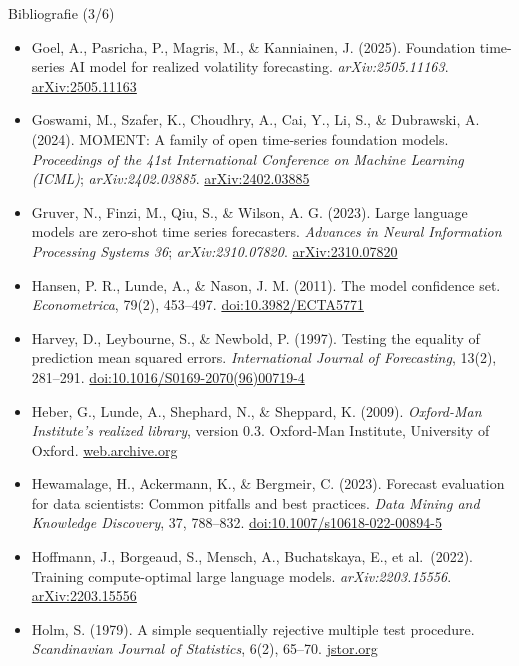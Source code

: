 \begin{frame}{Bibliografie (3/6)}
\itemsize{\tiny}
\begin{itemize}
    \item Goel, A., Pasricha, P., Magris, M., \& Kanniainen, J. (2025). Foundation time-series AI model for realized volatility forecasting. \textit{arXiv:2505.11163}. \href{https://arxiv.org/abs/2505.11163}{arXiv:2505.11163}
    \item Goswami, M., Szafer, K., Choudhry, A., Cai, Y., Li, S., \& Dubrawski, A. (2024). MOMENT: A family of open time-series foundation models. \textit{Proceedings of the 41st International Conference on Machine Learning (ICML)}; \textit{arXiv:2402.03885}. \href{https://arxiv.org/abs/2402.03885}{arXiv:2402.03885}
    \item Gruver, N., Finzi, M., Qiu, S., \& Wilson, A. G. (2023). Large language models are zero-shot time series forecasters. \textit{Advances in Neural Information Processing Systems 36}; \textit{arXiv:2310.07820}. \href{https://arxiv.org/abs/2310.07820}{arXiv:2310.07820}
    \item Hansen, P. R., Lunde, A., \& Nason, J. M. (2011). The model confidence set. \textit{Econometrica}, 79(2), 453--497. \href{https://doi.org/10.3982/ECTA5771}{doi:10.3982/ECTA5771}
    \item Harvey, D., Leybourne, S., \& Newbold, P. (1997). Testing the equality of prediction mean squared errors. \textit{International Journal of Forecasting}, 13(2), 281--291. \href{https://doi.org/10.1016/S0169-2070(96)00719-4}{doi:10.1016/S0169-2070(96)00719-4}
    \item Heber, G., Lunde, A., Shephard, N., \& Sheppard, K. (2009). \textit{Oxford-Man Institute's realized library}, version 0.3. Oxford-Man Institute, University of Oxford. \href{https://web.archive.org/web/20220301022212/https://realized.oxford-man.ox.ac.uk/}{web.archive.org}
    \item Hewamalage, H., Ackermann, K., \& Bergmeir, C. (2023). Forecast evaluation for data scientists: Common pitfalls and best practices. \textit{Data Mining and Knowledge Discovery}, 37, 788--832. \href{https://doi.org/10.1007/s10618-022-00894-5}{doi:10.1007/s10618-022-00894-5}
    \item Hoffmann, J., Borgeaud, S., Mensch, A., Buchatskaya, E., et al.\ (2022). Training compute-optimal large language models. \textit{arXiv:2203.15556}. \href{https://arxiv.org/abs/2203.15556}{arXiv:2203.15556}
    \item Holm, S. (1979). A simple sequentially rejective multiple test procedure. \textit{Scandinavian Journal of Statistics}, 6(2), 65--70. \href{https://www.jstor.org/stable/4615733}{jstor.org}

\end{itemize}
\end{frame}
